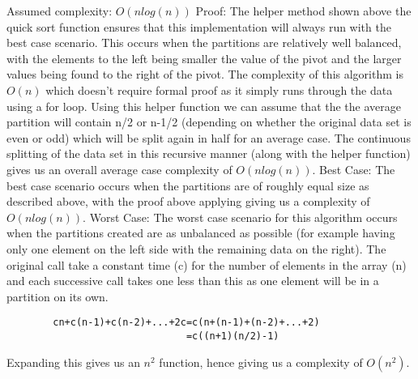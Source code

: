 \documentclass{article}
\begin{document}
Assumed complexity: \begin{math}O(nlog(n)) \end{math}
\newline\newline\newline
Proof:
\newline
The helper method shown above the quick sort function ensures that this implementation will always run with the best case scenario. This occurs when the partitions are relatively well balanced, with the elements to the left being smaller the value of the pivot and the larger values being found to the right of the pivot. The complexity of this algorithm is \begin{math}O(n)\end{math} which doesn't require formal proof as it simply runs through the data using a for loop. Using this helper function we can assume that the the average partition will contain n/2 or n-1/2 (depending on whether the original data set is even or odd) which will be split again in half for an average case. The continuous splitting of the data set in this recursive manner (along with the helper function) gives us an overall average case complexity of \begin{math}O(nlog(n))\end{math}.
\newline\newline
Best Case:
\newline
The best case scenario occurs when the partitions are of roughly equal size as described above, with the proof above applying giving us a complexity of\begin{math}O(nlog(n))\end{math}.
\newline\newline
Worst Case:
\newline
The worst case scenario for this algorithm occurs when the partitions created are as unbalanced as possible (for example having only one element on the left side with the remaining data on the right). The original call take a constant time (c) for the number of elements in the array (n) and each successive call takes one less than this as one element will be in a partition on its own.
\newline
\begin{verbatim}
        cn+c(n-1)+c(n-2)+...+2c=c(n+(n-1)+(n-2)+...+2)
                               =c((n+1)(n/2)-1)
\end{verbatim}
Expanding this gives us an \begin{math}n^2\end{math} function, hence giving us a complexity of \begin{math}O(n^2)\end{math}.
\end{document}
